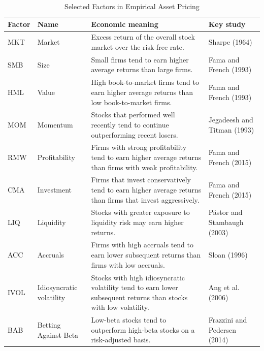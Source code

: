 \begin{table}[htbp]
\centering
\caption{Selected Factors in Empirical Asset Pricing}
\label{tab:03-factor-zoo}
\small
\begin{tabularx}{\textwidth}{l l X l}
\hline
\textbf{Factor} & \textbf{Name} & \textbf{Economic meaning} & \textbf{Key study} \\
\hline
MKT & Market
& Excess return of the overall stock market over the risk-free rate.
& Sharpe (1964) \\

SMB & Size
& Small firms tend to earn higher average returns than large firms.
& Fama and French (1993) \\

HML & Value
& High book-to-market firms tend to earn higher average returns than low book-to-market firms.
& Fama and French (1993) \\

MOM & Momentum
& Stocks that performed well recently tend to continue outperforming recent losers.
& Jegadeesh and Titman (1993) \\

RMW & Profitability
& Firms with strong profitability tend to earn higher average returns than firms with weak profitability.
& Fama and French (2015) \\

CMA & Investment
& Firms that invest conservatively tend to earn higher average returns than firms that invest aggressively.
& Fama and French (2015) \\

LIQ & Liquidity
& Stocks with greater exposure to liquidity risk may earn higher returns.
& Pástor and Stambaugh (2003) \\

ACC & Accruals
& Firms with high accruals tend to earn lower subsequent returns than firms with low accruals.
& Sloan (1996) \\

IVOL & Idiosyncratic volatility
& Stocks with high idiosyncratic volatility tend to earn lower subsequent returns than stocks with low volatility.
& Ang et al. (2006) \\

BAB & Betting Against Beta
& Low-beta stocks tend to outperform high-beta stocks on a risk-adjusted basis.
& Frazzini and Pedersen (2014) \\
\hline
\end{tabularx}
\end{table}


